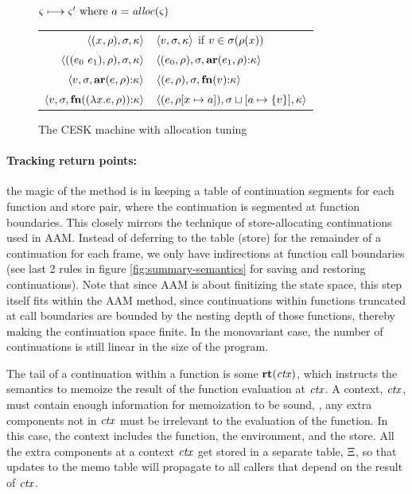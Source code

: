 \begin{figure}
  \centering
  $\varsigma \longmapsto \varsigma' \text{ where } a = \mathit{alloc}(\varsigma)$ \\
  \begin{tabular}{r|l}
    \hline
    $\langle (x^{{}}, \rho), \sigma, \kappa \rangle$
    &
    $\langle v,\sigma,\kappa \rangle$ if $v \in \sigma(\rho(x))$
    \\
    $\langle ((e_{0}\ e_{1}){}, \rho), \sigma, \kappa \rangle$
    &
    $\langle (e_{0}, \rho), \sigma, \mathbf{ar}{}(e_{1},\rho){\tt :} \kappa \rangle$
    \\
    $\langle v, \sigma, \mathbf{ar}{}(e,\rho){\tt :} \kappa \rangle$
    &
    $\langle (e, \rho), \sigma, \mathbf{fn}{}(v){\tt :} \kappa \rangle$
    \\
    $\langle v,\sigma,\mathbf{fn}{}((\lambda{} x. e, \rho)){\tt :} \kappa \rangle$
    &
    $\langle (e, \rho[x \mapsto a]), \sigma\sqcup[a \mapsto \{ v \}], \kappa \rangle$
  \end{tabular}
  \caption{The CESK machine with allocation tuning}
  \label{fig:base-semantics}
\end{figure}

\paragraph{Tracking return points:} the magic of the method is in keeping a table of continuation segments for each function and store pair, where the continuation is segmented at function boundaries.
%
This closely mirrors the technique of store-allocating continuations used in AAM.
%
Instead of deferring to the table (store) for the remainder of a continuation for each frame, we only have indirections at function call boundaries (see last 2 rules in figure \ref{fig:summary-semantics} for saving and restoring continuations).
%
Note that since AAM is about finitizing the state space, this step itself fits within the AAM method, since continuations within functions truncated at call boundaries are bounded by the nesting depth of those functions, thereby making the continuation space finite.
%
In the monovariant case, the number of continuations is still linear in the size of the program.

The tail of a continuation within a function is some $\mathbf{rt}(\mathit{ctx})$, which instructs the semantics to memoize the result of the function evaluation at $\mathit{ctx}$.
%
A context, $\mathit{ctx}$, must contain enough information for memoization to be sound, \ie, any extra components not in $\mathit{ctx}$ must be irrelevant to the evaluation of the function.
%
In this case, the context includes the function, the environment, and the store.
%
All the extra components at a context $\mathit{ctx}$ get stored in a separate table, $\Xi$, so that updates to the memo table will propagate to all callers that depend on the result of $\mathit{ctx}$.

